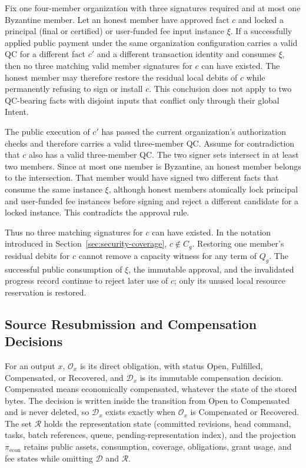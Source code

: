 \begin{lemma}
\label{lem:security-superseded}
Fix one four-member organization with three signatures required and at
most one Byzantine member.  Let an honest member have approved fact
$c$ and locked a principal (final or certified) or user-funded fee input instance $\xi$.
If a successfully applied public payment under the same organization
configuration carries a valid QC for a different fact $c'$ and a different
transaction identity and consumes $\xi$, then no three matching valid
member signatures for $c$ can have existed. The honest member may therefore
restore the residual local debits of $c$ while permanently refusing to
sign or install $c$.  This conclusion does not apply to two
QC-bearing facts with disjoint inputs that conflict only through their
global Intent.
\end{lemma}

\begin{IEEEproof}
The public execution of $c'$ has passed the current organization's
authorization checks and therefore carries a valid three-member QC.
Assume for contradiction that $c$ also has a valid three-member QC.
The two signer sets intersect in at least two members.  Since at most
one member is Byzantine, an honest member belongs to the intersection.
That member would have signed two different facts that consume the
same instance $\xi$, although honest members atomically lock principal
and user-funded fee instances before signing and reject a different
candidate for a locked instance.  This contradicts the approval rule.

Thus no three matching signatures for $c$ can have existed. In the
notation introduced in Section~\ref{sec:security-coverage}, $c\notin C_g$.
Restoring one member's residual debits for $c$ cannot remove
a capacity witness for any term of $Q_g$.  The successful public
consumption of $\xi$, the immutable approval, and the invalidated
progress record continue to reject later use of $c$; only its unused
local resource reservation is restored.
\end{IEEEproof}

\subsection{Source Resubmission and Compensation Decisions}
\label{sec:security-decision}

For an output $x$, $\mathcal O_x$ is its direct obligation, with status Open, Fulfilled, Compensated, or Recovered, and $\mathcal D_x$ is its immutable compensation decision. Compensated means economically compensated, whatever the state of the stored bytes. The decision is written inside the transition from Open to Compensated and is never deleted, so $\mathcal D_x$ exists exactly when $\mathcal O_x$ is Compensated or Recovered. The set $\mathcal R$ holds the representation state (committed revisions, head command, tasks, batch references, queue, pending-representation index), and the projection $\pi_{\mathrm{econ}}$ retains public assets, consumption, coverage, obligations, grant usage, and fee states while omitting $\mathcal D$ and $\mathcal R$.

